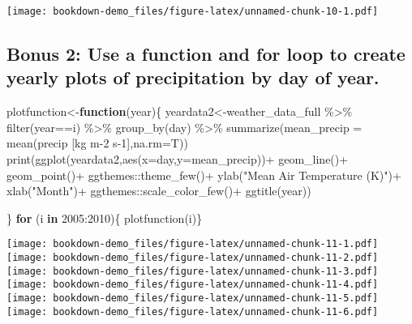 \documentclass[
]{book}
\newenvironment{Shaded}{\begin{snugshade}}{\end{snugshade}}
\newcommand{\AttributeTok}[1]{\textcolor[rgb]{0.77,0.63,0.00}{#1}}
\newcommand{\ControlFlowTok}[1]{\textcolor[rgb]{0.13,0.29,0.53}{\textbf{#1}}}
\newcommand{\DecValTok}[1]{\textcolor[rgb]{0.00,0.00,0.81}{#1}}
\newcommand{\FunctionTok}[1]{\textcolor[rgb]{0.00,0.00,0.00}{#1}}
\newcommand{\NormalTok}[1]{#1}
\newcommand{\OtherTok}[1]{\textcolor[rgb]{0.56,0.35,0.01}{#1}}
\newcommand{\SpecialCharTok}[1]{\textcolor[rgb]{0.00,0.00,0.00}{#1}}
\newcommand{\StringTok}[1]{\textcolor[rgb]{0.31,0.60,0.02}{#1}}
\begin{document}
\texttt{[image: bookdown-demo\_files/figure-latex/unnamed-chunk-10-1.pdf]}

\hypertarget{bonus-2-use-a-function-and-for-loop-to-create-yearly-plots-of-precipitation-by-day-of-year.}{%
\subsection{Bonus 2: Use a function and for loop to create yearly plots of precipitation by day of year.}\label{bonus-2-use-a-function-and-for-loop-to-create-yearly-plots-of-precipitation-by-day-of-year.}}

\begin{Shaded}
\begin{Highlighting}[]
\NormalTok{plotfunction}\OtherTok{\textless{}{-}}\ControlFlowTok{function}\NormalTok{(year)\{}
\NormalTok{  yeardata2}\OtherTok{\textless{}{-}}\NormalTok{weather\_data\_full }\SpecialCharTok{\%\textgreater{}\%} \FunctionTok{filter}\NormalTok{(year}\SpecialCharTok{==}\NormalTok{i) }\SpecialCharTok{\%\textgreater{}\%}
    \FunctionTok{group\_by}\NormalTok{(day) }\SpecialCharTok{\%\textgreater{}\%}
    \FunctionTok{summarize}\NormalTok{(}\AttributeTok{mean\_precip =} \FunctionTok{mean}\NormalTok{(}\StringTok{\textasciigrave{}}\AttributeTok{precip [kg m{-}2 s{-}1]}\StringTok{\textasciigrave{}}\NormalTok{,}\AttributeTok{na.rm=}\NormalTok{T))}
  \FunctionTok{print}\NormalTok{(}\FunctionTok{ggplot}\NormalTok{(yeardata2,}\FunctionTok{aes}\NormalTok{(}\AttributeTok{x=}\NormalTok{day,}\AttributeTok{y=}\NormalTok{mean\_precip))}\SpecialCharTok{+}
          \FunctionTok{geom\_line}\NormalTok{()}\SpecialCharTok{+}
          \FunctionTok{geom\_point}\NormalTok{()}\SpecialCharTok{+}
\NormalTok{          ggthemes}\SpecialCharTok{::}\FunctionTok{theme\_few}\NormalTok{()}\SpecialCharTok{+}
          \FunctionTok{ylab}\NormalTok{(}\StringTok{"Mean Air Temperature (K)"}\NormalTok{)}\SpecialCharTok{+}
          \FunctionTok{xlab}\NormalTok{(}\StringTok{"Month"}\NormalTok{)}\SpecialCharTok{+}
\NormalTok{          ggthemes}\SpecialCharTok{::}\FunctionTok{scale\_color\_few}\NormalTok{()}\SpecialCharTok{+}
          \FunctionTok{ggtitle}\NormalTok{(year))}
        
\NormalTok{\}}
\ControlFlowTok{for}\NormalTok{ (i }\ControlFlowTok{in} \DecValTok{2005}\SpecialCharTok{:}\DecValTok{2010}\NormalTok{)\{}
  \FunctionTok{plotfunction}\NormalTok{(i)\}}
\end{Highlighting}
\end{Shaded}

\texttt{[image: bookdown-demo\_files/figure-latex/unnamed-chunk-11-1.pdf]} \texttt{[image: bookdown-demo\_files/figure-latex/unnamed-chunk-11-2.pdf]} \texttt{[image: bookdown-demo\_files/figure-latex/unnamed-chunk-11-3.pdf]} \texttt{[image: bookdown-demo\_files/figure-latex/unnamed-chunk-11-4.pdf]} \texttt{[image: bookdown-demo\_files/figure-latex/unnamed-chunk-11-5.pdf]} \texttt{[image: bookdown-demo\_files/figure-latex/unnamed-chunk-11-6.pdf]}
\end{document}

